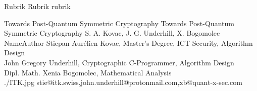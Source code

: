 \documentclass[a4paper,11pt]{article}
\begin{document}
\setcounter{footnote}{0}
\setcounter{figure}{0}


\Abschnitt
{Rubrik}
{Rubrik}
{rubrik}

\vspace{3mm}


\Aufsatz
{Towards Post-Quantum Symmetric Cryptography}
{Towards Post-Quantum Symmetric Cryptography}
{S. A. Kovac, J. G. Underhill, X. Bogomolec}
{NameAuthor}
{ Stiepan Aurélien Kovac, Master's Degree, ICT Security, Algorithm Design \\ John Gregory Underhill, Cryptographic C-Programmer, Algorithm Design\\ Dipl. Math. Xenia Bogomolec, Mathematical Analysis \\ }
{./ITK.jpg}
{stie@itk.swiss,john.underhill@protonmail.com,xb@quant-x-sec.com}
\end{document}
